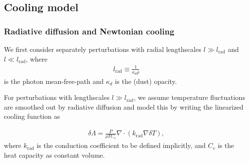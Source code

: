 \subsection{Cooling model} 


\subsubsection{Radiative diffusion and Newtonian cooling}

We first consider separately perturbations with radial lengthscales
$l\gg l_\mathrm{rad}$ and $l\ll l_\mathrm{rad}$, where       
\begin{align}\label{lrad}
  l_\mathrm{rad} \equiv \frac{1}{\kappa_d\rho} 
\end{align} is the photon mean-free-path and $\kappa_d$ is the (dust)
opacity. 

For perturbations with lengthscales $l\gg l_\mathrm{rad}$, we assume
temperature fluctuations are smoothed out by radiative diffusion and
model this by writing the linearized cooling function as 

\begin{align}\label{diff_cool_proper}
  \delta \Lambda = \frac{P}{\rho T C_v} \nabla\cdot\left(k_\mathrm{rad}\nabla\delta
    T\right),  
\end{align}
where $k_\mathrm{rad}$ is the conduction coefficient to be defined
implicitly, and $C_v$ is the heat capacity as constant volume. 


